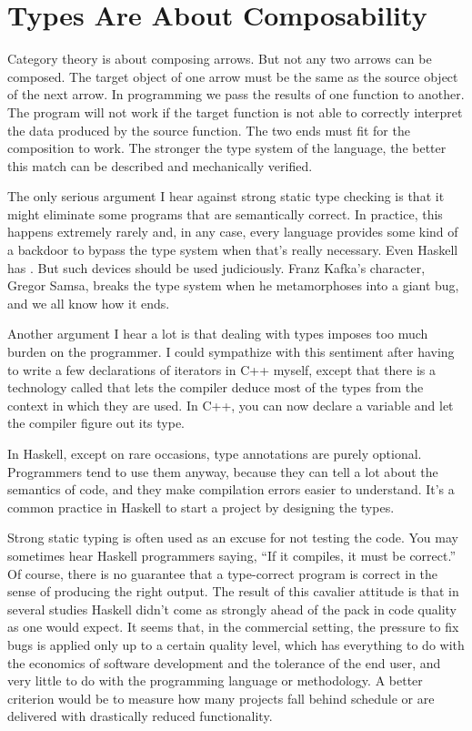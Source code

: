 \section{Types Are About Composability}

Category theory is about composing arrows. But not any two arrows can be
composed. The target object of one arrow must be the same as the source
object of the next arrow. In programming we pass the results of
one function to another. The program will not work if the target
function is not able to correctly interpret the data produced by the
source function. The two ends must fit for the composition to work. The
stronger the type system of the language, the better this match can be
described and mechanically verified.

The only serious argument I hear against strong static type checking is
that it might eliminate some programs that are semantically correct. In
practice, this happens extremely rarely and, in any case, every language
provides some kind of a backdoor to bypass the type system when that's
really necessary. Even Haskell has . But such
devices should be used judiciously. Franz Kafka's character, Gregor
Samsa, breaks the type system when he metamorphoses into a giant bug,
and we all know how it ends.

Another argument I hear a lot is that dealing with types imposes too
much burden on the programmer. I could sympathize with this sentiment
after having to write a few declarations of iterators in C++ myself,
except that there is a technology called  that lets
the compiler deduce most of the types from the context in which they are
used. In C++, you can now declare a variable  and let the
compiler figure out its type.

In Haskell, except on rare occasions, type annotations are purely
optional. Programmers tend to use them anyway, because they can tell a
lot about the semantics of code, and they make compilation errors easier
to understand. It's a common practice in Haskell to start a project by
designing the types. 

Strong static typing is often used as an excuse for not testing the
code. You may sometimes hear Haskell programmers saying, ``If it
compiles, it must be correct.'' Of course, there is no guarantee that a
type-correct program is correct in the sense of producing the right
output. The result of this cavalier attitude is that in several studies
Haskell didn't come as strongly ahead of the pack in code quality as one
would expect. It seems that, in the commercial setting, the pressure to
fix bugs is applied only up to a certain quality level, which has
everything to do with the economics of software development and the
tolerance of the end user, and very little to do with the programming
language or methodology. A better criterion would be to measure how many
projects fall behind schedule or are delivered with drastically reduced
functionality.

